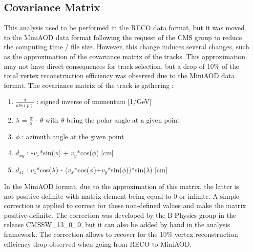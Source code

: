 \documentclass{cernatlasnote}
\begin{document}
\begin{appendices}
\section{Covariance Matrix}
\label{APP: COVMAT}
This analysis used to be performed in the RECO data format, but it was moved to the MiniAOD data format following the request of the CMS group to reduce the computing time / file size. However, this change induces several changes, such as the approximation of the covariance matrix of the tracks. This approximation may not have direct consequences for track selection, but a drop of 10\% of the total vertex reconstruction efficiency was observed due to the MiniAOD data format. 
The covariance matrix of the track is gathering :
\begin{enumerate}
    \item  $\frac{q}{abs(p)}$ :  signed inverse of momentum [1/GeV] 
    \item  $\lambda$ = $\frac{\pi}{2}$ - $\theta$ with $\theta$ being the polar angle at a given point 
    \item  $\phi$ : azimuth angle at the given point 
    \item  $d_{xy}$ : -$v_x$*sin($\phi$) + $v_y$*cos($\phi$) [cm] 
    \item  $d_{sz}$ : $v_z$*cos($\lambda$) - ($v_x$*cos($\phi$)+$v_y$*sin($\phi$))*sin($\lambda$) [cm] 
\end{enumerate}
In the MiniAOD format, due to the approximation of this matrix, the latter is not positive-definite with matrix element being equal to 0 or infinite. A simple correction is applied to correct for these non-defined values and make the matrix positive-definite. The correction was developed by the B Physics group \cite{COVMAT} in the release CMSSW\_13\_0\_0, but it can also be added by hand in the analysis framework. The correction allows to recover for the 10\% vertex reconstruction efficiency drop observed when going from RECO to MiniAOD.

\pagebreak

\end{appendices}
\end{document}
